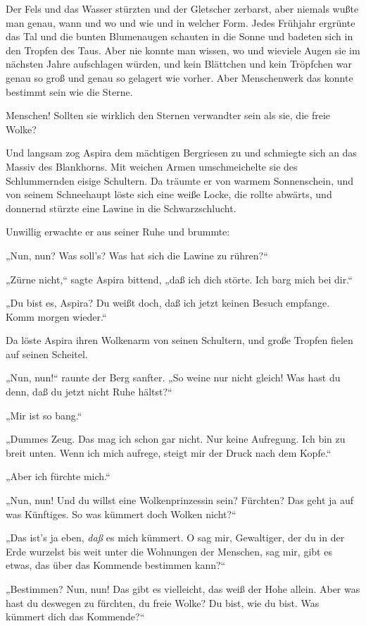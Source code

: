 Der Fels und das Wasser stürzten und der Gletscher zerbarst, aber
niemals wußte man genau, wann und wo und wie und in welcher Form.
Jedes Frühjahr ergrünte das Tal und die bunten Blumenaugen schauten
in die Sonne und badeten sich in den Tropfen des Taus. Aber nie
konnte man wissen, wo und wieviele Augen sie im nächsten Jahre
aufschlagen würden, und kein Blättchen und kein Tröpfchen war genau
so groß und genau so gelagert wie vorher. Aber Menschenwerk das
konnte bestimmt sein wie die Sterne.

Menschen! Sollten sie wirklich den Sternen verwandter sein als sie,
die freie Wolke?

Und langsam zog Aspira dem mächtigen Bergriesen zu und schmiegte
sich an das Massiv des Blankhorns. Mit weichen Armen umschmeichelte
sie des Schlummernden eisige Schultern. Da träumte er von warmem
Sonnenschein, und von seinem Schneehaupt löste sich eine weiße
Locke, die rollte abwärts, und donnernd stürzte eine Lawine in die
Schwarzschlucht.

Unwillig erwachte er aus seiner Ruhe und brummte:

„Nun, nun? Was soll's? Was hat sich die Lawine zu rühren?“

„Zürne nicht,“ sagte Aspira bittend, „daß ich dich störte. Ich barg
mich bei dir.“

„Du bist es, Aspira? Du weißt doch, daß ich jetzt keinen Besuch
empfange. Komm morgen wieder.“

Da löste Aspira ihren Wolkenarm von seinen Schultern, und große
Tropfen fielen auf seinen Scheitel.

„Nun, nun!“ raunte der Berg sanfter. „So weine nur nicht gleich!
Was hast du denn, daß du jetzt nicht Ruhe hältst?“

„Mir ist so bang.“

„Dummes Zeug. Das mag ich schon gar nicht. Nur keine Aufregung. Ich
bin zu breit unten. Wenn ich mich aufrege, steigt mir der Druck
nach dem Kopfe.“

„Aber ich fürchte mich.“

„Nun, nun! Und du willst eine Wolkenprinzessin sein? Fürchten? Das
geht ja auf was Künftiges. So was kümmert doch Wolken nicht?“

„Das ist's ja eben, \emph{daß} es mich kümmert. O sag mir,
Gewaltiger, der du in der Erde wurzelst bis weit unter die
Wohnungen der Menschen, sag mir, gibt es etwas, das über das
Kommende bestimmen kann?“

„Bestimmen? Nun, nun! Das gibt es vielleicht, das weiß der Hohe
allein. Aber was hast du deswegen zu fürchten, du freie Wolke? Du
bist, wie du bist. Was kümmert dich das Kommende?“

